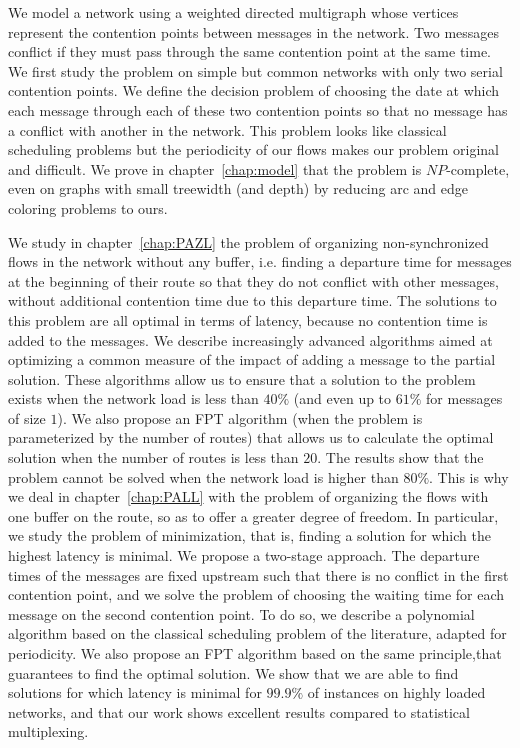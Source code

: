 We model a network using a weighted directed multigraph whose vertices represent the contention points between messages in the network. Two messages conflict if they must pass through the same contention point at the same time. We first study the problem on simple but common networks with only two serial contention points. We define the decision problem of choosing the date at which each message through each of these two contention points so that no message has a conflict with another in the network. This problem looks like classical scheduling problems but the periodicity of our flows makes our problem original and difficult.
 We prove in chapter~\ref{chap:model} that the problem is $NP$-complete, even on graphs with small treewidth (and depth) by reducing arc and edge coloring problems to ours.


We study in chapter~\ref{chap:PAZL} the problem of organizing non-synchronized flows in the network without any buffer, i.e. finding a departure time for messages at the beginning of their route so that they do not conflict with other messages, without additional contention time due to this departure time. The solutions to this problem are all optimal in terms of latency, because no contention time is added to the messages. We describe increasingly advanced algorithms aimed at optimizing a common measure of the impact of adding a message to the partial solution. These algorithms allow us to ensure that a solution to the problem exists when the network load is less than $40\%$ (and even up to $61\%$ for messages of size $1$). We also propose an FPT algorithm (when the problem is parameterized by the number of routes) that allows us to calculate the optimal solution when the number of routes is less than $20$. The results show that the problem cannot be solved when the network load is higher than $80\%$.
This is why we deal in chapter~\ref{chap:PALL} with the problem of organizing the flows with one buffer on the route, so as to offer a greater degree of freedom. In particular, we study the problem of minimization, that is, finding a solution for which the highest latency is minimal. We propose a two-stage approach. The departure times of the messages are fixed upstream such that there is no conflict in the first contention point, and we solve the problem of choosing the waiting time for each message on the second contention point. To do so, we describe a polynomial algorithm based on the classical scheduling problem of the literature, adapted for periodicity. We also propose an FPT algorithm based on the same principle,that guarantees to find the optimal solution. We show that we are able to find solutions for which latency is minimal for $99.9\%$ of instances on highly loaded networks, and that our work shows excellent results compared to statistical multiplexing.

